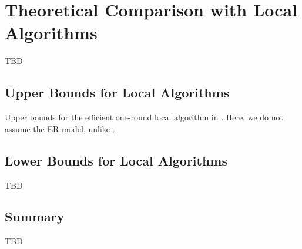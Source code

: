 \section{Theoretical Comparison with Local Algorithms}
\label{sec:comp}
TBD

\subsection{Upper Bounds for Local Algorithms}
\label{sub:upper}
Upper bounds for the efficient one-round local algorithm in \cite{Imola_USENIX22}. Here, we do not assume the ER model, unlike \cite{Imola_USENIX21}. 

\subsection{Lower Bounds for Local Algorithms}
\label{sub:lower}
TBD

\subsection{Summary}
\label{sub:comp}
TBD
